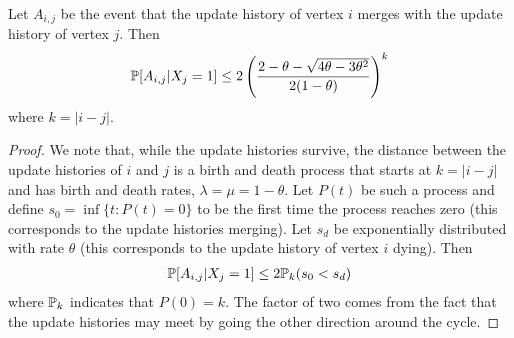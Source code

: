 	\begin{lemma}
	\label{lem:A_ij bound conditioned}
		Let $A_{i,j}$ be the event that the update history of vertex $i$ merges with the update history of vertex $j$. Then
		\begin{equation}
			\mathbb{P}[A_{i,j}|X_{j} = 1] \leq 2\left(\frac{2 - \theta - \sqrt{4\theta - 3\theta^2}}{2(1 - \theta)}\right)^k
		\end{equation}
		where $k = |i - j|$.
	\end{lemma}
	\begin{proof}
		We note that, while the update histories survive, the distance between the update histories of $i$ and $j$ is a birth and death process that starts at $k = |i - j|$ and has birth and death rates, $\lambda = \mu = 1 - \theta$. Let $P(t)$ be such a process and define $s_0  = \inf\{t : P(t) = 0\}$ to be the first time the process reaches zero (this corresponds to the update histories merging). Let $s_d$ be exponentially distributed with rate $\theta$ (this corresponds to the update history of vertex $i$ dying). Then
		\begin{align}
		 	\mathbb{P}[A_{i,j} | X_j = 1] \leq 2 \mathbb{P}_k(s_0 < s_d)
		 \end{align} 
		 where $\mathbb{P}_k$ indicates that $P(0) = k$. The factor of two comes from the fact that the update histories may meet by going the other direction around the cycle.


\end{proof}
